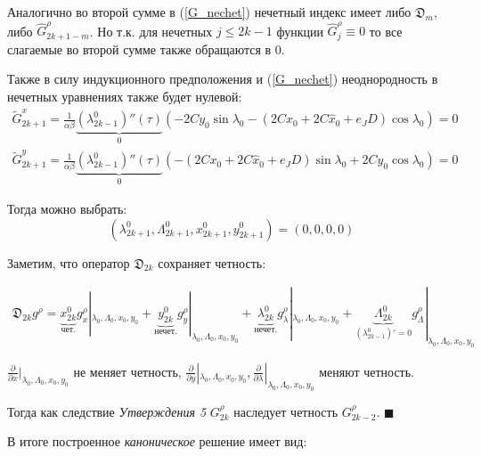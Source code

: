 Аналогично во второй сумме в (\ref{G_nechet}) нечетный индекс имеет либо $\mathfrak{D}_m$, либо $\hat G^\rho_{2k+1-m}$. Но т.к. для нечетных $j \le 2k-1$ функции $\hat G^\rho_{j} \equiv 0$ то все слагаемые во второй сумме также обращаются в 0. 

Также в силу индукционного предположения и (\ref{G_nechet}) неоднородность в нечетных уравнениях также будет нулевой:
\begin{equation*}
\begin{aligned}
\tilde G_{2k+1}^x  = \frac{1}{\alpha \beta} \underbrace{(\lambda^0_{2k-1})''(\tau)}_0 \left( -2Cy_0 \sin\lambda_0 - (2Cx_0+2C \hat x_0+e_JD) \cos\lambda_0 \right) =0
\end{aligned}
\end{equation*}
\begin{equation*}
\begin{aligned}
\tilde G_{2k+1}^y  = \frac{1}{\alpha \beta} \underbrace{(\lambda^0_{2k-1})''(\tau)}_0 \left( -(2Cx_0+2C \hat x_0+e_JD) \sin\lambda_0 + 2Cy_0 \cos\lambda_0 \right) = 0
\end{aligned}
\end{equation*}

Тогда можно выбрать:
$$({\lambda^0_{2k+1}, \Lambda^0_{2k+1}, x^0_{2k+1}, y^0_{2k+1}}) = (0,0,0,0)$$

Заметим, что оператор $\mathfrak{D}_{2k}$ сохраняет четность:

\begin{equation*}
\begin{aligned}
\mathfrak{D}_{2k}g^\rho = \underbrace{x^0_{2k}}_{\text{чет.}} g^\rho_x|_{\lambda_0,\Lambda_0,x_0,y_0} + \underbrace{y^0_{2k}}_{\text{нечет.}} g^\rho_y|_{\lambda_0,\Lambda_0,x_0,y_0} + \underbrace{\lambda^0_{2k}}_{\text{нечет.}} g^\rho_\lambda|_{\lambda_0,\Lambda_0,x_0,y_0} + \underbrace{\Lambda^0_{2k}}_{(\lambda^0_{2k-1})' = 0} g^\rho_\Lambda|_{\lambda_0,\Lambda_0,x_0,y_0}
\end{aligned}
\end{equation*}

$\frac{\partial}{\partial x}|_{\lambda_0,\Lambda_0,x_0,y_0}$ не меняет четность, $\frac{\partial}{\partial y}|_{\lambda_0,\Lambda_0,x_0,y_0}, \frac{\partial}{\partial \lambda}|_{\lambda_0,\Lambda_0,x_0,y_0}$ меняют четность.


Тогда как следствие \textit{Утверждения 5} $G_{2k}^\rho$ наследует четность $G_{2k-2}^\rho$.
$\blacksquare$

В итоге построенное \textit{каноническое} решение имеет вид:

